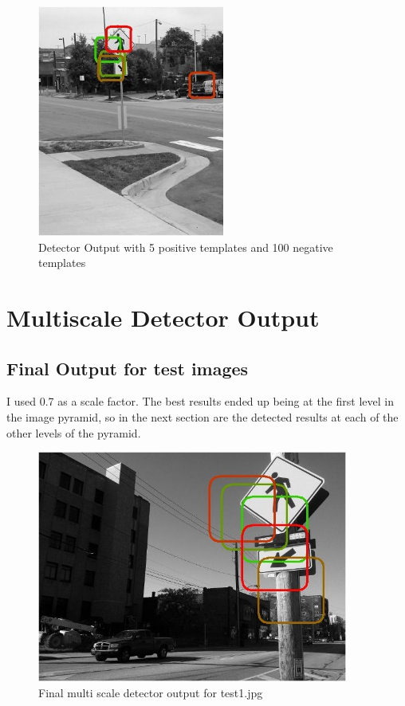 \documentclass[11pt,psfig]{article}
\begin{document}
\begin{figure}[H]
\centering
\includegraphics[height=3in]{prob5_a3plot2.jpg}
\caption{Detector Output with 5 positive templates and 100 negative templates}
\end{figure}

\section*{Multiscale Detector Output}

\subsection*{Final Output for test images}

I used 0.7 as a scale factor. The best results ended up being at the first level in the image pyramid, so in the next section are the detected results at each of the other levels of the pyramid. 

\begin{figure}[H]
\centering
\includegraphics[height=3in]{prob5b_plot1.jpg}
\caption{Final multi scale detector output for test1.jpg}
\end{figure}
\end{document}
